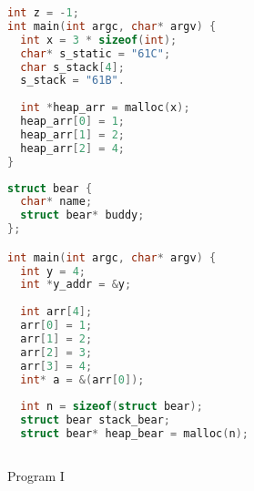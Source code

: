 \documentclass{article}
\begin{document}
\begin{figure}
\centering
\begin{minipage}{0.44\textwidth}
\renewcommand{\ttdefault}{pcr}
\begin{lstlisting}[language=C, basicstyle=\ttfamily,  keywordstyle=\bfseries, showstringspaces=false]
int z = -1;
int main(int argc, char* argv) {
  int x = 3 * sizeof(int);
  char* s_static = "61C";
  char s_stack[4];
  s_stack = "61B".
  
  int *heap_arr = malloc(x);
  heap_arr[0] = 1;
  heap_arr[1] = 2;
  heap_arr[2] = 4;
}
\end{lstlisting}
\caption{Program I}
\vspace{29.5mm}
\begin{lstlisting}[language=C, basicstyle=\ttfamily]
struct bear {
  char* name;
  struct bear* buddy;
};

int main(int argc, char* argv) {
  int y = 4;
  int *y_addr = &y;
	
  int arr[4];
  arr[0] = 1;
  arr[1] = 2;
  arr[2] = 3;
  arr[3] = 4;
  int* a = &(arr[0]);
	
  int n = sizeof(struct bear);
  struct bear stack_bear;
  struct bear* heap_bear = malloc(n);
  

\end{lstlisting}
\end{minipage}
\end{figure}
\end{document}

